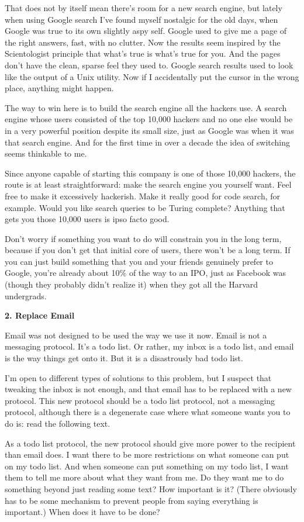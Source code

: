 That does not by itself mean there's room for a new search engine, but
lately when using Google search I've found myself nostalgic for the old
days, when Google was true to its own slightly aspy self. Google used to
give me a page of the right answers, fast, with no clutter. Now the
results seem inspired by the Scientologist principle that what's true is
what's true for you. And the pages don't have the clean, sparse feel
they used to. Google search results used to look like the output of a
Unix utility. Now if I accidentally put the cursor in the wrong place,
anything might happen.

The way to win here is to build the search engine all the hackers use. A
search engine whose users consisted of the top 10,000 hackers and no one
else would be in a very powerful position despite its small size, just
as Google was when it was that search engine. And for the first time in
over a decade the idea of switching seems thinkable to me.

Since anyone capable of starting this company is one of those 10,000
hackers, the route is at least straightforward: make the search engine
you yourself want. Feel free to make it excessively hackerish. Make it
really good for code search, for example. Would you like search queries
to be Turing complete? Anything that gets you those 10,000 users is ipso
facto good.

Don't worry if something you want to do will constrain you in the long
term, because if you don't get that initial core of users, there won't
be a long term. If you can just build something that you and your
friends genuinely prefer to Google, you're already about 10\% of the way
to an IPO, just as Facebook was (though they probably didn't realize it)
when they got all the Harvard undergrads.

\textbf{2. Replace Email}

Email was not designed to be used the way we use it now. Email is not a
messaging protocol. It's a todo list. Or rather, my inbox is a todo
list, and email is the way things get onto it. But it is a disastrously
bad todo list.

I'm open to different types of solutions to this problem, but I suspect
that tweaking the inbox is not enough, and that email has to be replaced
with a new protocol. This new protocol should be a todo list protocol,
not a messaging protocol, although there is a degenerate case where what
someone wants you to do is: read the following text.

As a todo list protocol, the new protocol should give more power to the
recipient than email does. I want there to be more restrictions on what
someone can put on my todo list. And when someone can put something on
my todo list, I want them to tell me more about what they want from me.
Do they want me to do something beyond just reading some text? How
important is it? (There obviously has to be some mechanism to prevent
people from saying everything is important.) When does it have to be
done?

